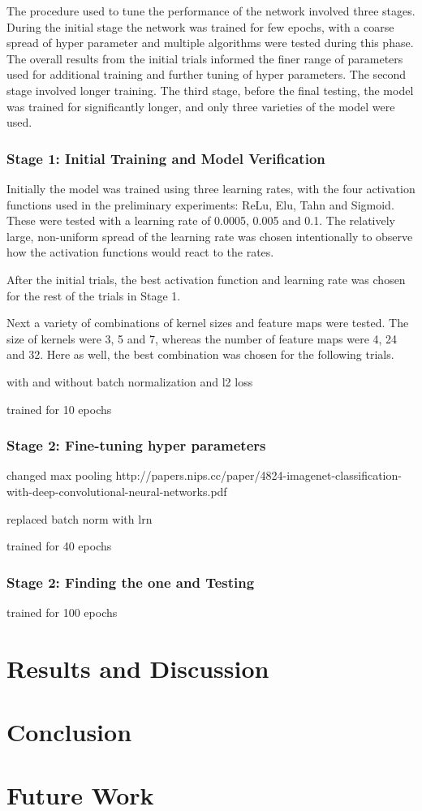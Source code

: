 \documentclass[]{article}
\begin{document}
The procedure used to tune the performance of the network involved three stages. During the initial stage the network was trained for few epochs, with a coarse spread of hyper parameter and multiple algorithms were tested during this phase. The overall results from the initial trials informed the finer range of parameters used for additional training and further tuning of hyper parameters. The second stage involved longer training. The third stage, before the final testing, the model was trained for significantly longer, and only three varieties of the model were used. 

\subsubsection{Stage 1: Initial Training and Model Verification}

Initially the model was trained using three learning rates, with the four activation functions used in the preliminary experiments: ReLu, Elu, Tahn and Sigmoid. These were tested with a learning rate of 0.0005, 0.005 and 0.1. The relatively large, non-uniform spread of the learning rate was chosen intentionally to observe how the activation functions would react to the rates.

After the initial trials, the best activation function and learning rate was chosen for the rest of the trials in Stage 1. 

Next a variety of combinations of kernel sizes and feature maps were tested. The size of kernels were 3, 5 and 7, whereas the number of feature maps were 4, 24 and 32. Here as well, the best combination was chosen for the following trials.


with and without batch normalization and l2 loss

trained for 10 epochs


\subsubsection{Stage 2: Fine-tuning hyper parameters}


changed max pooling
http://papers.nips.cc/paper/4824-imagenet-classification-with-deep-convolutional-neural-networks.pdf

replaced batch norm with lrn

trained for 40 epochs


\subsubsection{Stage 2: Finding the one and Testing}

trained for 100 epochs
 
 
\section{Results and Discussion}

\section{Conclusion}

\section{Future Work}


\clearpage
\medskip


\end{document}
